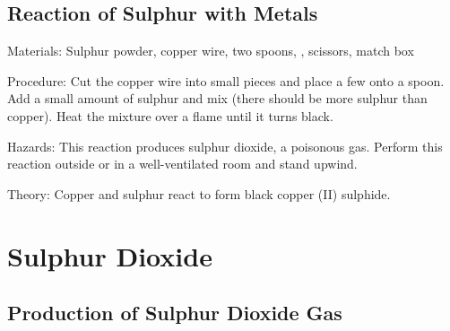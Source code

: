 \begin{multicols}{2}
\subsection{Reaction of Sulphur with Metals} %


\begin{description*}
\item[Materials:]{Sulphur powder, copper wire, two spoons, , scissors, match box}
\item[Procedure:]{Cut the copper wire into small pieces and place a few onto a spoon. Add a small amount of sulphur and mix (there should be more sulphur than copper). Heat the mixture over a flame until it turns black.}
\item[Hazards:]{This reaction produces sulphur dioxide, a poisonous gas. Perform this
reaction outside or in a well-ventilated room and stand upwind.}
\item[Theory:]{Copper and sulphur react to form black copper (II) sulphide.}
\end{description*}


\section*{Sulphur Dioxide}


\subsection{Production of Sulphur Dioxide Gas} %


\end{multicols}
